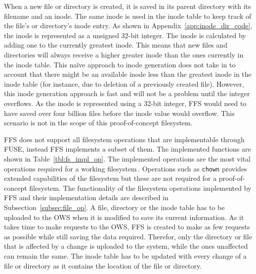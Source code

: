 When a new file or directory is created, it is saved in its parent directory with its filename and an inode. The same inode is used in the inode table to keep track of the file's or directory's inode entry. As shown in Appendix~\ref{app:inode_dir_code}, the inode is represented as a unsigned 32-bit integer. The inode is calculated by adding one to the currently greatest inode. This means that new files and directories will always receive a higher greater inode than the ones currently in the inode table. This naïve approach to inode generation does not take in to account that there might be an available inode less than the greatest inode in the inode table (for instance, due to deletion of a previously created file). However, this inode generation approach is fast and will not be a problem until the integer overflows. As the inode is represented using a 32-bit integer, FFS would need to have saved over four billion files before the inode value would overflow. This scenario is not in the scope of this proof-of-concept filesystem.

FFS does not support all filesystem operations that are implementable through FUSE, instead FFS implements a subset of them. The implemented functions are shown in Table~\ref{tbl:fs_impl_op}. The implemented operations are the most vital operations required for a working filesystem\,\cite{kuenningCS135FUSEDocumentation2010}. Operations such as \texttt{chown} provides extended capabilities of the filesystem but these are not required for a proof-of-concept filesystem. The functionality of the filesystem operations implemented by FFS and their implementation details are described in Subsection~\ref{subsec:file_op}. A file, directory or the inode table has to be uploaded to the OWS when it is modified to save its current information. As it takes time to make requests to the OWS, FFS is created to make as few requests as possible while still saving the data required. Therefor, only the directory or file that is affected by a change is uploaded to the system, while the ones unaffected can remain the same. The inode table has to be updated with every change of a file or directory as it contains the location of the file or directory.

